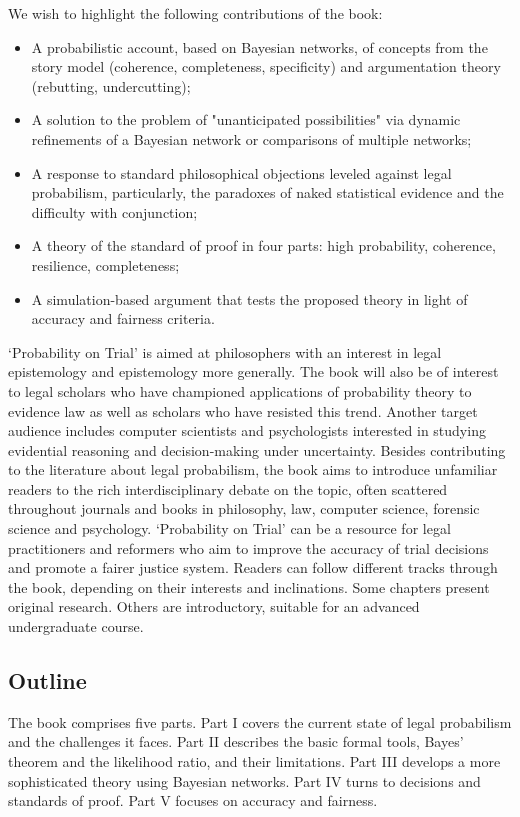 \documentclass[
  10pt,
  dvipsnames,enabledeprecatedfontcommands]{scrartcl}
\begin{document}
We wish to highlight the following contributions of the book:

\begin{itemize}
\item A probabilistic account, based on Bayesian networks, of concepts from the story model (coherence, completeness, specificity) and argumentation theory (rebutting, undercutting);
\item A solution to the problem of "unanticipated possibilities" via dynamic refinements of a Bayesian network or comparisons of multiple networks;
\item A response to standard philosophical objections leveled against legal probabilism, particularly, the paradoxes of naked statistical evidence and the difficulty with conjunction; 
\item A theory of the standard of proof in four parts: high probability, coherence, resilience, completeness;
\item A simulation-based argument that tests the proposed theory in light of accuracy and fairness criteria.
\end{itemize}

`Probability on Trial' is aimed at philosophers with an interest in
legal epistemology and epistemology more generally. The book will also
be of interest to legal scholars who have championed applications of
probability theory to evidence law as well as scholars who have resisted
this trend. Another target audience includes computer scientists and
psychologists interested in studying evidential reasoning and
decision-making under uncertainty. Besides contributing to the
literature about legal probabilism, the book aims to introduce
unfamiliar readers to the rich interdisciplinary debate on the topic,
often scattered throughout journals and books in philosophy, law,
computer science, forensic science and psychology. `Probability on
Trial' can be a resource for legal practitioners and reformers who aim
to improve the accuracy of trial decisions and promote a fairer justice
system. Readers can follow different tracks through the book, depending
on their interests and inclinations. Some chapters present original
research. Others are introductory, suitable for an advanced
undergraduate course.

\hypertarget{outline}{%
\subsection{Outline}\label{outline}}

The book comprises five parts. Part I covers the current state of legal
probabilism and the challenges it faces. Part II describes the basic
formal tools, Bayes' theorem and the likelihood ratio, and their
limitations. Part III develops a more sophisticated theory using
Bayesian networks. Part IV turns to decisions and standards of proof.
Part V focuses on accuracy and fairness.
\end{document}
